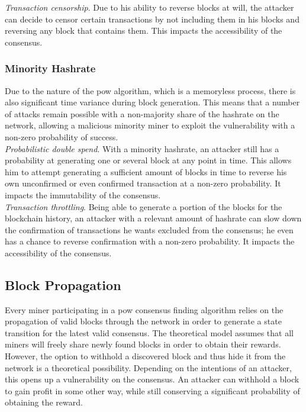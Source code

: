 \documentclass[12pt,a4paper]{article}
\begin{document}
\textit{Transaction censorship}. Due to his ability to reverse blocks at will, the attacker can decide to censor certain \glspl{transaction} by not including them in his blocks and reversing any block that contains them. This impacts the accessibility of the \gls{consensus}.

\subsubsection{Minority Hashrate}

Due to the nature of the \acrshort{pow} algorithm, which is a memoryless process, there is also significant time variance during block generation. This means that a number of attacks remain possible with a non-majority share of the \gls{hashrate} on the network, allowing a malicious minority miner to exploit the vulnerability with a non-zero probability of success.\\

\textit{Probabilistic double spend}. With a minority \gls{hashrate}, an attacker still has a probability at generating one or several block at any point in time. This allows him to attempt generating a sufficient amount of blocks in time to reverse his own unconfirmed or even confirmed \gls{transaction} at a non-zero probability. It impacts the immutability of the \gls{consensus}.\\

\textit{Transaction throttling}. Being able to generate a portion of the blocks for the blockchain history, an attacker with a relevant amount of \gls{hashrate} can slow down the confirmation of \glspl{transaction} he wants excluded from the \gls{consensus}; he even has a chance to reverse confirmation with a non-zero probability. It impacts the accessibility of the \gls{consensus}.\\

\subsection{Block Propagation}

Every miner participating in a \gls{pow} consensus finding algorithm relies on the propagation of valid blocks through the network in order to generate a state transition for the latest valid \gls{consensus}. The theoretical model assumes that all miners will freely share newly found blocks in order to obtain their \glspl{reward}.\\

However, the option to withhold a discovered block and thus hide it from the network is a theoretical possibility. Depending on the intentions of an attacker, this opens up a vulnerability on the \gls{consensus}. An attacker can withhold a block to gain profit in some other way, while still conserving a significant probability of obtaining the \gls{reward}.\\
\end{document}
